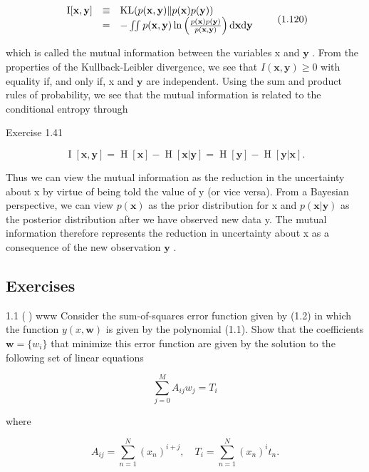 \documentclass[
  10
]{article}
\begin{document}
\[
\begin{array}{r c l} \mathrm{I} [ \mathbf {x}, \mathbf {y} ] & \equiv & \mathrm{KL} (p (\mathbf {x}, \mathbf {y}) \| p (\mathbf {x}) p (\mathbf {y})) \\ & = & - \iint p (\mathbf {x}, \mathbf {y}) \ln \left(\frac {p (\mathbf {x}) p (\mathbf {y})}{p (\mathbf {x} , \mathbf {y})}\right) \mathrm{d} \mathbf {x} \mathrm{d} \mathbf {y} \end{array}\tag{1.120}
\]

which is called the mutual information between the variables x and
\(\mathbf { y }\) . From the properties of the Kullback-Leibler
divergence, we see that
\(I ( \mathbf { x } , \mathbf { y } ) \geqslant 0\) with equality if,
and only if, x and \(\mathbf { y }\) are independent. Using the sum and
product rules of probability, we see that the mutual information is
related to the conditional entropy through

Exercise 1.41

\[
\operatorname{I} [ \mathbf {x}, \mathbf {y} ] = \operatorname{H} [ \mathbf {x} ] - \operatorname{H} [ \mathbf {x} | \mathbf {y} ] = \operatorname{H} [ \mathbf {y} ] - \operatorname{H} [ \mathbf {y} | \mathbf {x} ].\tag{1.121}
\]

Thus we can view the mutual information as the reduction in the
uncertainty about x by virtue of being told the value of y (or vice
versa). From a Bayesian perspective, we can view \(p ( \mathbf { x } )\)
as the prior distribution for x and
\(p ( \mathbf { x } | \mathbf { y } )\) as the posterior distribution
after we have observed new data y. The mutual information therefore
represents the reduction in uncertainty about x as a consequence of the
new observation \(\mathbf { y }\) .

\subsection{Exercises}\label{exercises-1}

1.1 () www Consider the sum-of-squares error function given by (1.2) in
which the function \(y ( x , \mathbf { w } )\) is given by the
polynomial (1.1). Show that the coefficients
\(\mathbf { w } = \{ w _ { i } \}\) that minimize this error function
are given by the solution to the following set of linear equations

\[
\sum_ {j = 0} ^ {M} A _ {i j} w _ {j} = T _ {i}\tag{1.122}
\]

where

\[
A _ {i j} = \sum_ {n = 1} ^ {N} (x _ {n}) ^ {i + j}, \quad T _ {i} = \sum_ {n = 1} ^ {N} (x _ {n}) ^ {i} t _ {n}.\tag{1.123}
\]
\end{document}
